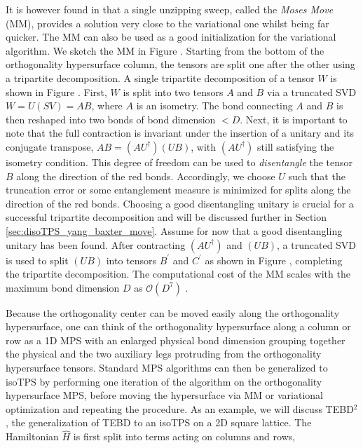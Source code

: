 It is however found in \cite{cite:isometric_tensor_network_states_in_two_dimensions} that a single unzipping sweep, called the \textit{Moses Move} (MM), provides a solution very close to the variational one whilst being far quicker. The MM can also be used as a good initialization for the variational algorithm. We sketch the MM in Figure . Starting from the bottom of the orthogonality hypersurface column, the tensors are split one after the other using a tripartite decomposition. A single tripartite decomposition of a tensor $W$ is shown in Figure . First, $W$ is split into two tensors $A$ and $B$ via a truncated SVD $W = U(SV) = AB$, where $A$ is an isometry. The bond connecting $A$ and $B$ is then reshaped into two bonds of bond dimension $<D$. Next, it is important to note that the full contraction is invariant under the insertion of a unitary and its conjugate transpose, $AB = (AU^\dagger)(UB)$, with $(AU^\dagger)$ still satisfying the isometry condition. This degree of freedom can be used to \textit{disentangle} the tensor $B$ along the direction of the red bonds. Accordingly, we choose $U$ such that the truncation error or some entanglement measure is minimized for splits along the direction of the red bonds. Choosing a good disentangling unitary is crucial for a successful tripartite decomposition and will be discussed further in Section \ref{sec:disoTPS_yang_baxter_move}. Assume for now that a good disentangling unitary has been found. After contracting $(AU^\dagger)$ and $(UB)$, a truncated SVD is used to split $(UB)$ into tensors $B^\prime$ and $C^\prime$ as shown in Figure , completing the tripartite decomposition. The computational cost of the MM scales with the maximum bond dimension $D$ as $\mathcal{O}(D^7)$ \cite{cite:isometric_tensor_network_states_in_two_dimensions, cite:efficient_simulation_of_dynamics_in_two_dimensional_quantum_spin_systems}.\par
Because the orthogonality center can be moved easily along the orthogonality hypersurface, one can think of the orthogonality hypersurface along a column or row as a 1D MPS with an enlarged physical bond dimension grouping together the physical and the two auxiliary legs protruding from the orthogonality hypersurface tensors. Standard MPS algorithms can then be generalized to isoTPS by performing one iteration of the algorithm on the orthogonality hypersurface MPS, before moving the hypersurface via MM or variational optimization and repeating the procedure. As an example, we will discuss TEBD$^2$, the generalization of TEBD to an isoTPS on a 2D square lattice. The Hamiltonian $\hat{H}$ is first split into terms acting on columns and rows,
